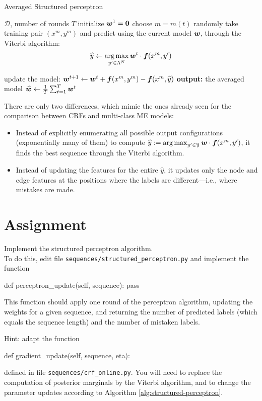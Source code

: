 \begin{algorithm}[h!]
   \caption{Averaged Structured perceptron \label{alg:structured-perceptron}}
\begin{algorithmic}[1]
    $\mathcal{D}$, number of rounds $T$
   \STATE initialize $\boldsymbol{w}^1 = \mathbf{0}$
	\STATE choose $m=m(t)$ randomly
	\STATE take training pair $(x^m, y^m)$ and 
predict using the current model $\boldsymbol{w}$, through the Viterbi algorithm: 
	$$\widehat{y}  \leftarrow \operatorname*{arg\,max}_{y' \in \Lambda^N} \boldsymbol{w}^t \cdot \boldsymbol{f}(x^m,y')$$	

	\STATE update the model: 
	$\boldsymbol{w}^{t+1} \leftarrow \boldsymbol{w}^{t} + \boldsymbol{f}(x^m,y^m) - \boldsymbol{f}(x^m,\widehat{y})$
	\ENDFOR
   \STATE \textbf{output:} the averaged model $\widehat{\boldsymbol{w}} \leftarrow \frac{1}{T}\sum_{t=1}^T \boldsymbol{w}^t$
\end{algorithmic}
\end{algorithm}



There are only two differences, which mimic the ones already seen for the comparison between CRFs 
and multi-class ME models:
\begin{itemize}
\item Instead of explicitly enumerating all possible output 
configurations (exponentially many of them) to compute 
 $\widehat{y} := \operatorname*{arg\,max}_{y'\in\mathcal{Y}} \boldsymbol{w} \cdot \boldsymbol{f}(x^m,y')$, 
it finds the best sequence through the Viterbi algorithm. 
\item Instead of updating the features for the entire $\widehat{y}$, 
it updates only the node and edge features at the positions where the
  labels are different---i.e., where mistakes are made.
\end{itemize}



\section{Assignment}

\begin{exercise}\label{exer:strucperc1}
Implement the structured perceptron algorithm.\\ 
To do this, edit file {\tt sequences/structured\_perceptron.py} 
and implement the function
\begin{python}
def perceptron_update(self, sequence):
    pass
\end{python}
This function should apply one round of the perceptron algorithm,
updating the weights for a given sequence, and returning
the number of predicted labels (which equals the sequence length) 
and the number of mistaken labels. 

Hint: adapt the function 
\begin{python}
def gradient_update(self, sequence, eta):
\end{python}
defined in file {\tt sequences/crf\_online.py}. 
You will need to replace the computation of posterior marginals 
by the Viterbi algorithm, and to change the parameter updates 
according to Algorithm \ref{alg:structured-perceptron}.
\end{exercise}


